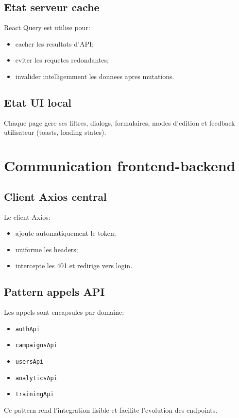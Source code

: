 \documentclass[12pt,a4paper,oneside]{report}
\begin{document}
\subsection{Etat serveur cache}
React Query est utilise pour:
\begin{itemize}[leftmargin=1.2cm]
  \item cacher les resultats d'API;
  \item eviter les requetes redondantes;
  \item invalider intelligemment les donnees apres mutations.
\end{itemize}

\subsection{Etat UI local}
Chaque page gere ses filtres, dialogs, formulaires, modes d'edition et feedback utilisateur (toasts, loading states).

\section{Communication frontend-backend}
\subsection{Client Axios central}
Le client Axios:
\begin{itemize}[leftmargin=1.2cm]
  \item ajoute automatiquement le token;
  \item uniforme les headers;
  \item intercepte les 401 et redirige vers login.
\end{itemize}

\subsection{Pattern appels API}
Les appels sont encapsules par domaine:
\begin{itemize}[leftmargin=1.2cm]
  \item \texttt{authApi}
  \item \texttt{campaignsApi}
  \item \texttt{usersApi}
  \item \texttt{analyticsApi}
  \item \texttt{trainingApi}
\end{itemize}

Ce pattern rend l'integration lisible et facilite l'evolution des endpoints.
\end{document}

